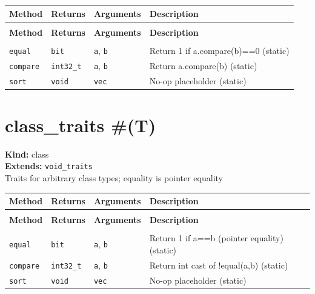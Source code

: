 \documentclass[11pt,letterpaper]{report}
\begin{document}
\begin{xltabular}{\linewidth}{>{\small}p{1.35in} >{\small}p{1.25in} >{\small}p{0.95in} >{\small}X}
\toprule
\textbf{Method} & \textbf{Returns} & \textbf{Arguments} & \textbf{Description} \\
\midrule
\endfirsthead
{} \\
\midrule
\textbf{Method} & \textbf{Returns} & \textbf{Arguments} & \textbf{Description} \\
\midrule
\endhead
\midrule
{} \\
\endfoot
\bottomrule
\endlastfoot
\texttt{equal} & \texttt{bit} & \texttt{a}, \texttt{b} & Return 1 if a.compare(b)==0 (static) \\
\texttt{compare} & \texttt{int32\_t} & \texttt{a}, \texttt{b} & Return a.compare(b) (static) \\
\texttt{sort} & \texttt{void} & \texttt{vec} & No-op placeholder (static) \\
\end{xltabular}

\section{class\_traits \#(T)}
\label{cls:classtraitsT}

\noindent\textbf{Kind:} class\\
\noindent\textbf{Extends:} \texttt{void\_traits}\\
\noindent Traits for arbitrary class types; equality is pointer equality

\begin{xltabular}{\linewidth}{>{\small}p{1.35in} >{\small}p{1.25in} >{\small}p{0.95in} >{\small}X}
\toprule
\textbf{Method} & \textbf{Returns} & \textbf{Arguments} & \textbf{Description} \\
\midrule
\endfirsthead
{} \\
\midrule
\textbf{Method} & \textbf{Returns} & \textbf{Arguments} & \textbf{Description} \\
\midrule
\endhead
\midrule
{} \\
\endfoot
\bottomrule
\endlastfoot
\texttt{equal} & \texttt{bit} & \texttt{a}, \texttt{b} & Return 1 if a==b (pointer equality) (static) \\
\texttt{compare} & \texttt{int32\_t} & \texttt{a}, \texttt{b} & Return int cast of !equal(a,b) (static) \\
\texttt{sort} & \texttt{void} & \texttt{vec} & No-op placeholder (static) \\
\end{xltabular}
\end{document}
